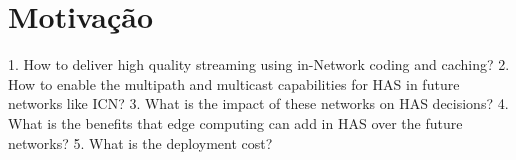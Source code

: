 \section{Motivação}




1. How to deliver high quality streaming using in-Network coding and caching?
2. How to enable the multipath and multicast capabilities for HAS in future networks like ICN?
3. What is the impact of these networks on HAS decisions?
4. What is the benefits that edge computing can add in HAS over the future networks?
5. What is the deployment cost?

%
%
%
%
%
%
